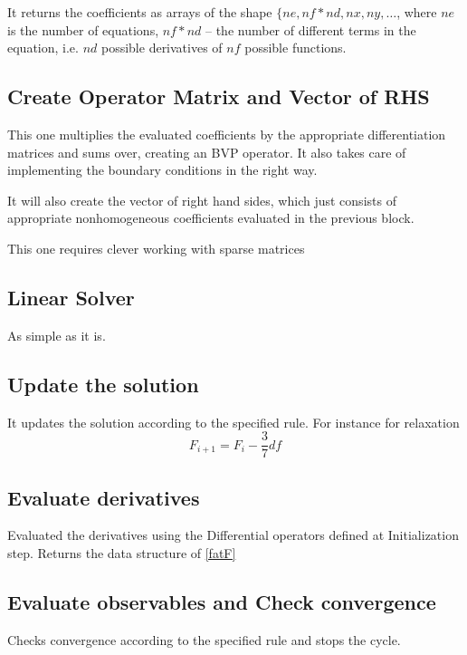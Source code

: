 \documentclass[a4paper,12pt]{article}
\begin{document}
It returns the coefficients as arrays of the shape $\{ ne, nf * nd, nx , ny, \dots$, where $ne$ is the number of equations, $nf * nd$ -- the number of different terms in the equation, i.e. $nd$ possible derivatives of $nf$ possible functions. 

\subsection{\label{sec:construct_oper} Create Operator Matrix and Vector of RHS}
This one multiplies the evaluated coefficients by the appropriate differentiation matrices and sums over, creating an BVP operator. It also takes care of implementing the boundary conditions in the right way. 

It will also create the vector of right hand sides, which just consists of appropriate nonhomogeneous coefficients evaluated in the previous block.

This one requires clever working with sparse matrices

\subsection{\label{sec:linear_sol} Linear Solver}
As simple as it is. 

\subsection{\label{update_sol} Update the solution}
It updates the solution according to the specified rule. For instance for relaxation
\begin{equation}
F_{i+1} = F_{i} - \frac{3}{7} df
\end{equation}

\subsection{\label{sec:eval_deriv} Evaluate derivatives}
Evaluated the derivatives using the Differential operators defined at Initialization step. Returns the data structure of \eqref{fatF}

\subsection{\label{sec:eval_observables} Evaluate observables and Check convergence}
Checks convergence according to the specified rule and stops the cycle.
\end{document}
